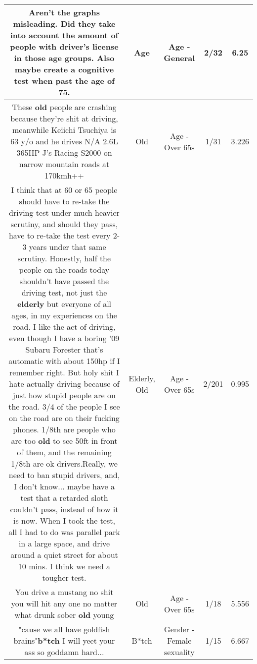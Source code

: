 \documentclass[11pt]{article}
\newlength\mylength
\begin{document}
\begin{center}
\begin{longtable}{|C{.65\mylength}|C{.30\mylength}|C{.12\mylength}|C{.12\mylength}|C{.12\mylength}|}
  \small Aren't the graphs misleading. Did they take into account the amount of people with driver's license in those \textbf{age} groups. Also maybe create a cognitive test when past the \textbf{age} of 75.\normalsize   & Age & Age - General & 2/32 & 6.25 \\  \hline
  \small These \textbf{old} people are crashing because they're shit at driving, meanwhile Keiichi Tsuchiya is 63 y/o and he drives N/A 2.6L 365HP J's Racing S2000 on narrow mountain roads at 170kmh++\normalsize   & Old & Age - Over 65s & 1/31 & 3.226 \\  \hline
  \small I think that at 60 or 65 people should have to re-take the driving test under much heavier scrutiny, and should they pass, have to re-take the test every 2-3 years under that same scrutiny. Honestly, half the people on the roads today shouldn't have passed the driving test, not just the \textbf{elderly} but everyone of all ages, in my experiences on the road. I like the act of driving, even though I have a boring '09 Subaru Forester that's automatic with about 150hp if I remember right. But holy shit I hate actually driving because of just how stupid people are on the road. 3/4 of the people I see on the road are on their fucking phones. 1/8th are people who are too \textbf{old} to see 50ft in front of them, and the remaining 1/8th are ok drivers.Really, we need to ban stupid drivers, and, I don't know... maybe have a test that a retarded sloth couldn't pass, instead of how it is now. When I took the test, all I had to do was parallel park in a large space, and drive around a quiet street for about 10 mins. I think we need a tougher test.\normalsize   & Elderly, Old & Age - Over 65s & 2/201 & 0.995 \\  \hline
  \small You drive a mustang no shit you will hit any one no matter what drunk sober \textbf{old} young\normalsize   & Old & Age - Over 65s & 1/18 & 5.556 \\  \hline
  \small "cause we all have goldfish brains"\textbf{b*tch} I will yeet your ass so goddamn hard...\normalsize   & B*tch & Gender - Female sexuality & 1/15 & 6.667 \\  \hline

\end{longtable}
\end{center}
\end{document}
